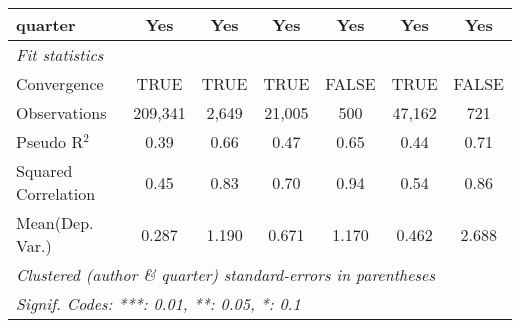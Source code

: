 \begin{tabular}{lcccccc}
   quarter                                                    & Yes          & Yes           & Yes           & Yes           & Yes          & Yes\\  
   \midrule
   \emph{Fit statistics}\\
   Convergence                                                &TRUE          & TRUE          & TRUE          & FALSE         & TRUE         & FALSE\\  
   Observations                                               & 209,341      & 2,649         & 21,005        & 500           & 47,162       & 721\\  
   Pseudo R$^2$                                               & 0.39         & 0.66          & 0.47          & 0.65          & 0.44         & 0.71\\  
   Squared Correlation                                        & 0.45         & 0.83          & 0.70          & 0.94          & 0.54         & 0.86\\  
Mean(Dep. Var.) & 0.287 & 1.190 & 0.671 & 1.170 & 0.462 & 2.688 \\
   \midrule \midrule
   \multicolumn{7}{l}{\emph{Clustered (author \& quarter) standard-errors in parentheses}}\\
   \multicolumn{7}{l}{\emph{Signif. Codes: ***: 0.01, **: 0.05, *: 0.1}}\\
\end{tabular}
\par\endgroup
